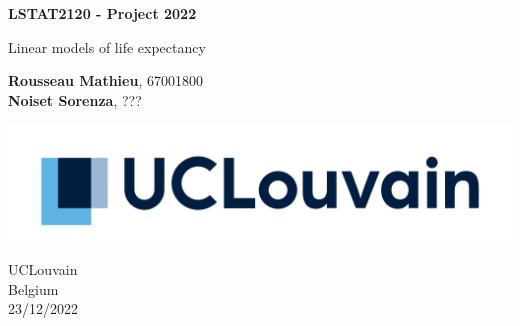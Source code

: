 \begin{titlepage}
	\begin{center}
	  \vspace*{1cm}
		  
	  \Huge
	  \textbf{LSTAT2120 - Project 2022}
		  
	  \vspace{0.5cm}
	  \LARGE
	  Linear models of life expectancy
		  
	  \vspace{2.5cm}
	  
	  \Large
	  \textbf{Rousseau Mathieu}, 67001800 \\
	  \textbf{Noiset Sorenza}, ???
		  
	  \vfill
		  
	  \vspace{0.8cm}
		  
	  \includegraphics[width=\textwidth]{figures/logo_ucl.png}
  
	  \vspace{0.8cm}
		  
	  \Large
	  UCLouvain \\
	  Belgium \\
	  23/12/2022
	\end{center}
  \end{titlepage}